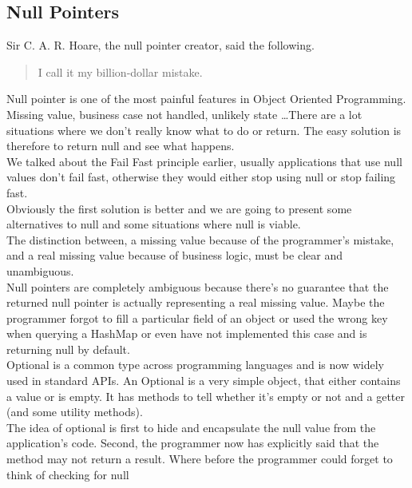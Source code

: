 \subsection{Null Pointers}\label{subsec:null-pointers}
Sir C. A. R. Hoare, the null pointer creator, said the following.
\begin{quotation}
    I call it my billion-dollar mistake.
\end{quotation}
Null pointer is one of the most painful features in Object Oriented
Programming.
Missing value, business case not handled, unlikely state \ldots There are
a lot situations where we don't really know what to do or return.
The easy solution is therefore to return null and see what happens. \\
We talked about the Fail Fast principle earlier, usually applications
that use null values don't fail fast, otherwise they would either
stop using null or stop failing fast. \\
Obviously the first solution is better and we are going to present some
alternatives to null and some situations where null is viable. \\
\newline
The distinction between, a missing value because of the
programmer's mistake, and a real missing value because of business logic,
must be clear and unambiguous. \\
Null pointers are completely ambiguous because there's no guarantee that
the returned null pointer is actually representing a real missing value.
Maybe the programmer forgot to fill a particular field of an object
or used the wrong key when querying a HashMap or even have not
implemented this case and is returning null by default.
\\
\newline
Optional is a common type across programming languages and is now widely
used in standard APIs.
An Optional is a very simple object, that either contains a value or
is empty.
It has methods to tell whether it's empty or not and a getter (and some
utility methods). \\
The idea of optional is first to hide and encapsulate the null value
from the application's code.
Second, the programmer now has explicitly said that the method may not
return a result.
Where before the programmer could forget to think of checking for null
